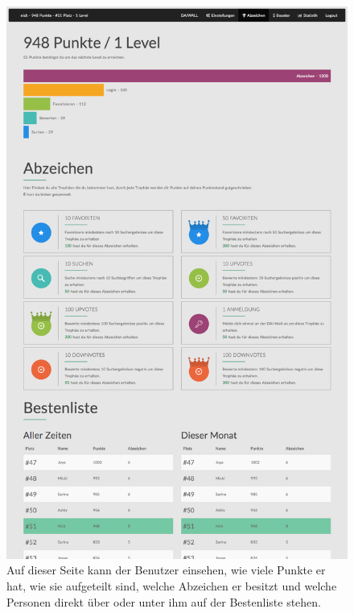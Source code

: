 \documentclass[12pt,twoside]{book}
\begin{document}
\begin{figure}[htbp]
    \centering
    \includegraphics[width=1.0\textwidth]{images/infoboard_usersite.png}
    \caption{Auf dieser Seite kann der Benutzer einsehen, wie viele Punkte er hat, wie sie aufgeteilt sind, welche Abzeichen er besitzt und welche Personen direkt über oder unter ihm auf der Bestenliste stehen. }
    \label{fig:usersite}
\end{figure}
\end{document}
